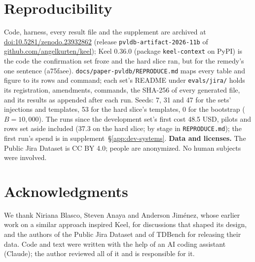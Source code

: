 \documentclass[sigconf, nonacm]{acmart}
\newcommand{\code}[1]{\texttt{#1}}
\begin{document}
\section*{Reproducibility}
\label{sec:repro}

Code, harness, every result file and the supplement are archived at \href{https://doi.org/10.5281/zenodo.23932862}{doi:10.5281/zenodo.23932862} (release \code{pvldb-artifact-2026-11b} of \href{https://github.com/angelkurten/keel}{github.com/angelkurten/keel}); Keel 0.36.0 (package \code{keel-context} on PyPI) is the code the confirmation set froze and the hard slice ran, but for the remedy's one sentence (a75faee). \code{docs/paper-pvldb/REPRODUCE.md} maps every table and figure to its rows and command; each set's README under \code{evals/jira/} holds its registration, amendments, commands, the SHA-256 of every generated file, and its results as appended after each run. Seeds: 7, 31 and 47 for the sets' injections and templates, 53 for the hard slice's templates, 0 for the bootstrap ($B = 10{,}000$). The runs since the development set's first cost 48.5 USD, pilots and rows set aside included (37.3 on the hard slice; by stage in \code{REPRODUCE.md}); the first run's spend is in supplement~\S\ref{app:dev-systems}. \textbf{Data and licenses.} The Public Jira Dataset is CC BY 4.0; people are anonymized. No human subjects were involved.

\section*{Acknowledgments}

We thank Niriana Blasco, Steven Anaya and Anderson Jiménez, whose earlier work on a similar approach inspired Keel, for discussions that shaped its design, and the authors of the Public Jira Dataset and of TDBench for releasing their data. Code and text were written with the help of an AI coding assistant (Claude); the author reviewed all of it and is responsible for it.
\end{document}
